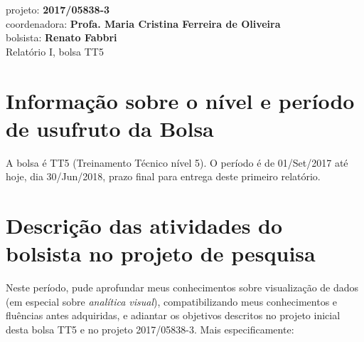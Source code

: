 \documentclass[a4paper, 11pt]{article}
\begin{document}
\noindent
\normalsize projeto: \textbf{2017/05838-3} \\
coordenadora: \textbf{Profa. Maria Cristina Ferreira de Oliveira} \\
bolsista: \textbf{Renato Fabbri} \\
Relatório I, bolsa TT5 \\

\section{Informação sobre o nível e período de usufruto da Bolsa}
A bolsa é TT5 (Treinamento Técnico nível 5).
O período é de 01/Set/2017 até hoje, dia 30/Jun/2018,
prazo final para entrega deste primeiro relatório.

% 
\section{Descrição das atividades do bolsista no projeto de pesquisa}
Neste período, pude aprofundar meus conhecimentos sobre visualização de dados
(em especial sobre \emph{analítica visual}),
compatibilizando meus conhecimentos e fluências antes adquiridas,
e adiantar os objetivos descritos no projeto inicial desta bolsa TT5 e no
projeto 2017/05838-3.
Mais especificamente:
\end{document}
